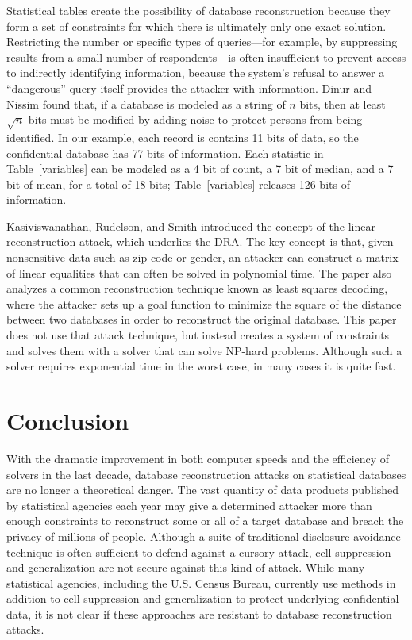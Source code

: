 \documentclass[runningheads]{llncs}
\begin{document}
Statistical tables create the possibility of database reconstruction
because they form a set of constraints for which there is ultimately
only one exact solution. Restricting the number or specific types of
queries---for example, by suppressing results from a small number of
respondents---is often insufficient to prevent access to indirectly
identifying information, because the system's refusal to answer a
``dangerous'' query itself provides the attacker with information.
Dinur and Nissim found that, if a database is modeled as a string of
$n$ bits, then at least $\sqrt{n}$ bits must be modified by adding
noise to protect persons from being identified. In our example, each
record is contains 11 bits of data, so the confidential database has
77 bits of information. Each statistic in Table~\ref{variables}
can be modeled as a 4 bit of count, a 7 bit of median, and a 7 bit of
mean, for a total of 18 bits; Table~\ref{variables} releases 126 bits
of information.

Kasiviswanathan, Rudelson, and Smith\cite{Kasiviswanathan:2013:PLR:2627817.2627919} introduced
the concept of the linear reconstruction attack, which underlies the  DRA. The key concept is that,
given nonsensitive data such as zip code or gender, an attacker
can construct a matrix of linear equalities that can often be solved
in polynomial time. The paper also analyzes a common reconstruction
technique known as least squares decoding, where the attacker sets up
a goal function to minimize the square of the distance between two
databases in order to reconstruct the original database. This paper
does not use that attack technique, but instead creates a system of
constraints and solves them with a solver that can solve NP-hard
problems. Although such a solver requires exponential time in the
worst case, in many cases it is quite fast.

\section{Conclusion}

With the dramatic improvement in both computer speeds and the
efficiency of solvers in the last decade, database reconstruction
attacks on statistical databases are no longer a theoretical
danger. The vast quantity of data products published by statistical
agencies each year may give a determined attacker more than enough
constraints to reconstruct some or all of a target database and breach
the privacy of millions of people. Although a suite of traditional
disclosure avoidance technique is often sufficient to defend against a
cursory attack, cell suppression and generalization are not secure
against this kind of attack.  While many statistical agencies,
including the U.S. Census Bureau, currently use methods in addition to
cell suppression and generalization to protect underlying confidential
data, it is not clear if these approaches are resistant to database
reconstruction attacks.
\end{document}
